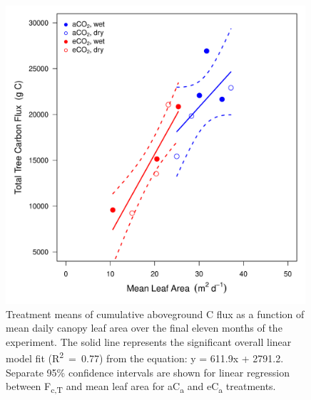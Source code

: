\documentclass[a4paper]{article}\usepackage[]{graphicx}\usepackage[]{color}
\begin{document}
\begin{figure}[h!]
    \centering
    \includegraphics[width=0.99\textwidth]{flux_leafarea_co2.pdf}
    \caption{Treatment means of cumulative aboveground C flux as a function of mean daily canopy leaf area over the final eleven months of the experiment. The solid line represents the significant overall linear model fit (R\textsuperscript{2}~=~0.77) from the equation: y = 611.9x + 2791.2. Separate 95\% confidence intervals are shown for linear regression between F\textsubscript{c,T} and mean leaf area for aC\textsubscript{a} and eC\textsubscript{a} treatments.}
    \label{fig:figure 4.4}
\end{figure}
\end{document}
